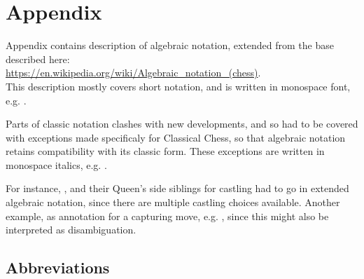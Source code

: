 

\chapter*{Appendix}
\label{ch:Appendix}

Appendix contains description of algebraic notation, extended from the base described here: \\
\href{https://en.wikipedia.org/wiki/Algebraic\_notation\_(chess)}{https://en.wikipedia.org/wiki/Algebraic\_notation\_(chess)}. \\
This description mostly covers short notation, and is written in monospace font, e.g. .

Parts of classic notation clashes with new developments, and so had to be covered with
exceptions made specificaly for Classical Chess, so that algebraic notation retains
compatibility with its classic form. These exceptions are written in monospace italics,
e.g. .

For instance, ,  and their Queen's side siblings for castling had
to go in extended algebraic notation, since there are multiple castling choices available.
Another example,  as annotation for a capturing move, e.g. , since
this might also be interpreted as disambiguation.

\clearpage %

\section*{Abbreviations}
\label{sec:Appendix/Abbreviations}

